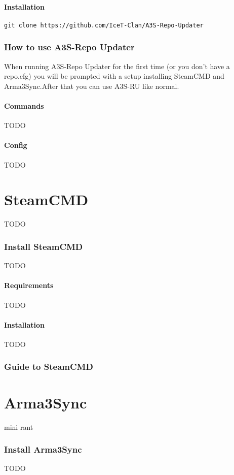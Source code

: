 \documentclass[a4paper]{article}
\begin{document}
			\subsection{Installation}
				\lstset{language=sh}
				\begin{lstlisting}
git clone https://github.com/IceT-Clan/A3S-Repo-Updater
				\end{lstlisting}
	
		\section{How to use A3S-Repo Updater}
			When running A3S-Repo Updater for the first time (or you don't have a repo.cfg) you will be prompted with a setup installing SteamCMD and Arma3Sync.\newline After that you can use A3S-RU like normal.
			\subsection{Commands}
				TODO
			\subsection{Config}
				TODO
	\newpage
	
	\part{SteamCMD}
		TODO
		\section{Install SteamCMD}
			TODO
			\subsection{Requirements}
				TODO
			\subsection{Installation}
				TODO
		\section{Guide to SteamCMD}
	\newpage
	
	\part{Arma3Sync}
		mini rant
		\section{Install Arma3Sync}
			TODO
\end{document}
